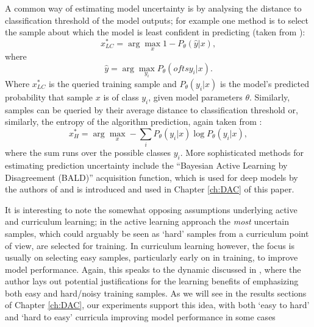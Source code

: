 A common way of estimating model uncertainty is by analysing the distance to classification threshold of the model outputs; for example one method is to select the sample about which the model is least confident in predicting (taken from \cite{settles2012active}):
\begin{equation}
x^{*}_{LC} = \arg\max_{x} 1 - P_{\theta}(\hat{y}|x),
\end{equation}
where
\begin{equation}
\hat{y} = \arg\max_{y_i}P_{\theta}(oftsy_i|x).
\end{equation}
Where $x^{*}_{LC}$ is the queried training sample and $P_{\theta}(y_{i}|x)$ is the model's predicted probability that sample $x$ is of class $y_{i}$, given model parameters $\theta$. Similarly, samples can be queried by their average distance to classification threshold or, similarly, the entropy of the algorithm prediction, again taken from \cite{settles2012active}:
\begin{equation}
x^{*}_{H} = \arg\max_{x} - \sum_{i} P_{\theta}(y_i|x)\log P_{\theta}(y_i|x),
\end{equation}
where the sum runs over the possible classes $y_i$. More sophisticated methods for estimating prediction uncertainty include the ``Bayesian Active Learning by Disagreement (BALD)'' \cite{houlsby2011bayesian} acquisition function, which is used for deep models by the authors of \cite{gal2017deep} and is introduced and used in Chapter \ref{ch:DAC} of this paper.

It is interesting to note the somewhat opposing assumptions underlying active and curriculum learning; in the active learning approach the \textit{most} uncertain samples, which could arguably be seen as `hard' samples from a curriculum point of view, are selected for training. In curriculum learning however, the focus is usually on selecting easy samples, particularly early on in training, to improve model performance. Again, this speaks to the dynamic discussed in \cite{ELMAN199371}, where the author lays out potential justifications for the learning benefits of emphasizing both easy and hard/noisy training samples. As we will see in the results sections of Chapter \ref{ch:DAC}, our experiments support this idea, with both `easy to hard' and `hard to easy' curricula improving model performance in some cases

